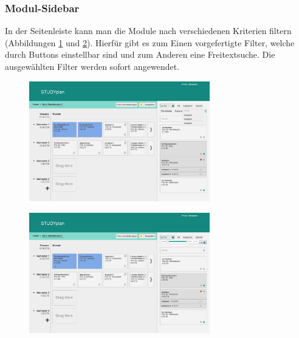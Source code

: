 \subsubsection{Modul-Sidebar}
\label{subsec:gui-modul-sidebar}
In der Seitenleiste kann man die Module nach verschiedenen Kriterien filtern (Abbildungen \ref{fig:gui-module-filtern-1} und \ref{fig:gui-module-filtern-2}). Hierfür gibt es zum Einen vorgefertigte Filter, welche durch Buttons einstellbar sind und zum Anderen eine Freitextsuche. Die ausgewählten Filter werden sofort angewendet.
\begin{figure}[!htb]
	\caption{}
	\label{fig:gui-module-filtern-1}
	\centering
	\includegraphics[width=0.7\textwidth]{../GUI/ergebnisse/module-filtern-1.png}
\end{figure}
\begin{figure}[!htb]
	\caption{}
	\label{fig:gui-module-filtern-2}
	\centering
	\includegraphics[width=0.7\textwidth]{../GUI/ergebnisse/module-filtern-2.png}
\end{figure}

